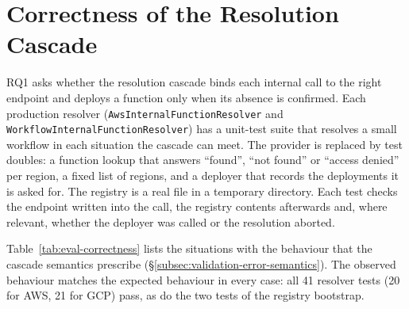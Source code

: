 \section{Correctness of the Resolution Cascade}
\label{sec:eval-correctness}

RQ1 asks whether the resolution cascade binds each internal call to the right endpoint and deploys
a function only when its absence is confirmed. Each production resolver
(\texttt{Aws\allowbreak Internal\allowbreak Function\allowbreak Resolver} and
\texttt{Workflow\allowbreak Internal\allowbreak Function\allowbreak Resolver}) has a unit-test
suite that resolves a small workflow in each situation the cascade can meet. The provider is
replaced by test doubles: a function lookup that answers ``found'', ``not found'' or ``access
denied'' per region, a fixed list of regions, and a deployer that records the deployments it is
asked for. The registry is a real file in a temporary directory. Each test checks the endpoint
written into the call, the registry contents afterwards and, where relevant, whether the deployer
was called or the resolution aborted.

Table~\ref{tab:eval-correctness} lists the situations with the behaviour that the cascade
semantics prescribe (\S\ref{subsec:validation-error-semantics}). The observed behaviour matches the
expected behaviour in every case: all 41 resolver tests (20 for AWS, 21 for GCP) pass, as do the
two tests of the registry bootstrap.

